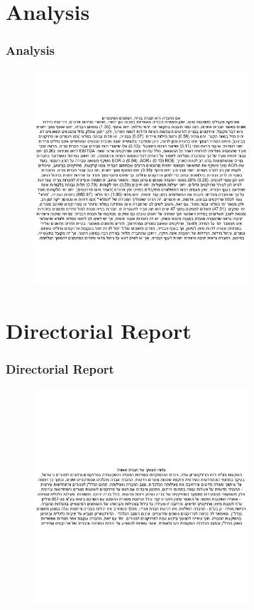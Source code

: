 \documentclass{beamer}%
\begin{document}
\section{Analysis}%
\label{sec:Analysis}%
\begin{frame}%
\frametitle{Analysis}%


\begin{figure}[h!]%
\centering%
\includegraphics[width=80mm]{Ratios_Anlysis.png}%
\end{figure}

%
\end{frame}

%
\section{Directorial Report}%
\label{sec:DirectorialReport}%
\begin{frame}%
\frametitle{Directorial Report}%


\begin{figure}[h!]%
\centering%
\includegraphics[width=80mm]{Directorion.png}%
\end{figure}

%
\end{frame}
\end{document}
